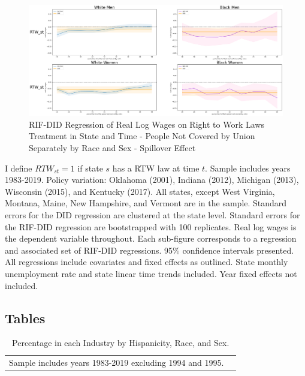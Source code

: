 \documentclass[11pt]{article}
\begin{document}
{\pagebreak
\begin{landscape}
\begin{figure}[ht!]
\centering
    \caption{RIF-DID Regression of Real Log Wages on Right to Work Laws Treatment in State and Time - People Not Covered by Union Separately by Race and Sex - Spillover Effect}\label{fig:rifdid-sltt-bw-B}
    \includegraphics[width=1.25\textwidth, height = \textheight, keepaspectratio]{figures/fin_rifdid-sltt-bw-B.png}
\end{figure}
\footnotesize{I define $RTW_{st} = 1$ if state $s$ has a RTW law at time $t$. Sample includes years 1983-2019. Policy variation: Oklahoma (2001), Indiana (2012), Michigan (2013), Wisconsin (2015), and Kentucky (2017). All states, except West Virginia, Montana, Maine, New Hampshire, and Vermont are in the sample. Standard errors for the DID regression are clustered at the state level. Standard errors for the RIF-DID regression are bootstrapped with 100 replicates. Real log wages is the dependent variable throughout. Each sub-figure corresponds to a regression and associated set of RIF-DID regressions. 95\% confidence intervals presented. All regressions include covariates and fixed effects as outlined. State monthly unemployment rate and state linear time trends included. Year fixed effects not included.}
\end{landscape}

\pagebreak
\begin{landscape}
\section*{Tables}
\small{}
\end{landscape}

\pagebreak
\begin{landscape}
\small{\begin{table}[h!]
    \centering
    \caption{Percentage in each Industry by Hispanicity, Race, and Sex.}\label{tab:nindtab}
    \fontsize{10}{11}\selectfont
\begin{tabular}{l*{8}{c}}

\hline\hline
\multicolumn{8}{l}{\footnotesize Sample includes years 1983-2019 excluding 1994 and 1995.}\\
\end{tabular}
\end{table}}


\end{landscape}}
\end{document}
